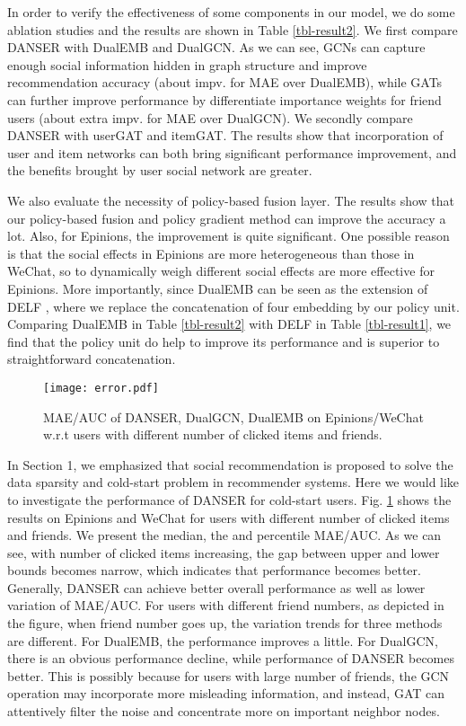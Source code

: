 \documentclass[sigconf]{acmart}
\begin{document}
In order to verify the effectiveness of some components in our model, we do some ablation studies and the results are shown in Table \ref{tbl-result2}. We first compare DANSER with DualEMB and DualGCN. As we can see, GCNs can capture enough social information hidden in graph structure and improve recommendation accuracy (about  impv. for MAE over DualEMB), while GATs can further improve performance by differentiate importance weights for friend users (about extra  impv. for MAE over DualGCN). We secondly compare DANSER with userGAT and itemGAT. The results show that incorporation of user and item networks can both bring significant performance improvement, and the benefits brought by user social network are greater.

We also evaluate the necessity of policy-based fusion layer. The results show that our policy-based fusion and policy gradient method can improve the accuracy a lot. Also, for Epinions, the improvement is quite significant. One possible reason is that the social effects in Epinions are more heterogeneous than those in WeChat, so to dynamically weigh different social effects are more effective for Epinions. More importantly, since DualEMB can be seen as the extension of DELF \cite{DELF}, where we replace the concatenation of four embedding by our policy unit. Comparing DualEMB in Table \ref{tbl-result2} with DELF in Table \ref{tbl-result1}, we find that the policy unit do help to improve its performance and is superior to straightforward concatenation.

\begin{figure}[h]
	\centering
	\texttt{[image: error.pdf]}
	\vspace{-5pt}
	\caption{MAE/AUC of DANSER, DualGCN, DualEMB on Epinions/WeChat w.r.t users with different number of clicked items and friends.}
	\label{fig-error}
	\vspace{-10pt}
\end{figure}

In Section 1, we emphasized that social recommendation is proposed to solve the data sparsity and cold-start problem in recommender systems. Here we would like to investigate the performance of DANSER for cold-start users. Fig. \ref{fig-error} shows the results on Epinions and WeChat for users with different number of clicked items and friends. We present the median, the  and percentile MAE/AUC. As we can see, with number of clicked items increasing, the gap between upper and lower bounds becomes narrow, which indicates that performance becomes better. Generally, DANSER can achieve better overall performance as well as lower variation of MAE/AUC. For users with different friend numbers, as depicted in the figure, when friend number goes up, the variation trends for three methods are different. For DualEMB, the performance improves a little. For DualGCN, there is an obvious performance decline, while performance of DANSER becomes better. This is possibly because for users with large number of friends, the GCN operation may incorporate more misleading information, and instead, GAT can attentively filter the noise and concentrate more on important neighbor nodes.
\end{document}
